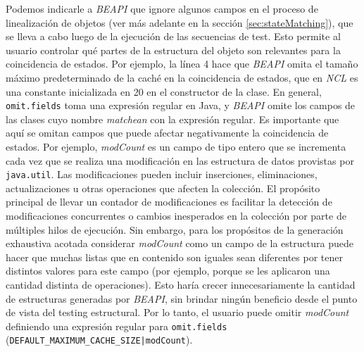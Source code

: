 Podemos indicarle a \emph{BEAPI} que ignore algunos campos en el proceso de
linealización de objetos (ver más adelante en la sección
\ref{sec:stateMatching}), que se lleva a cabo luego de la ejecución de las
secuencias de test. Esto permite al usuario controlar qué partes de la
estructura del objeto son relevantes para la coincidencia de estados. Por
ejemplo, la línea 4 hace que \emph{BEAPI} omita el tamaño máximo predeterminado
de la caché en la coincidencia de estados, que en \emph{NCL} es una
constante inicializada en 20 en el constructor de la clase. En general, \texttt{omit.fields}
toma una expresión regular en Java, y \emph{BEAPI} omite los campos de las clases
cuyo nombre \emph{matchean} con la expresión regular. Es importante que
aquí se omitan campos que puede afectar negativamente la coincidencia de
estados.
Por ejemplo, \emph{modCount} es un campo de tipo entero que se incrementa 
cada vez que se realiza una modificación en las estructura de datos
provistas por \texttt{java.util}. Las modificaciones pueden incluir 
inserciones, eliminaciones, actualizaciones u otras operaciones que afecten la colección. 
El propósito principal de llevar un contador de modificaciones es facilitar la detección de modificaciones concurrentes o cambios inesperados en la colección por parte de múltiples hilos de ejecución. 
Sin embargo, para los propósitos de la generación exhaustiva acotada considerar \emph{modCount} como un
campo de la estructura puede hacer que muchas listas que en contenido son iguales sean diferentes
por tener distintos valores para este campo (por ejemplo, porque se les
aplicaron una cantidad distinta de operaciones). Esto haría crecer
innecesariamente la cantidad de estructuras generadas por \emph{BEAPI}, sin
brindar ningún beneficio desde el punto de vista del testing estructural.
Por lo tanto, el usuario puede omitir \emph{modCount} definiendo una expresión 
regular para \texttt{omit.fields}
(\texttt{DEFAULT\_MAXIMUM\_CACHE\_SIZE|modCount}).



